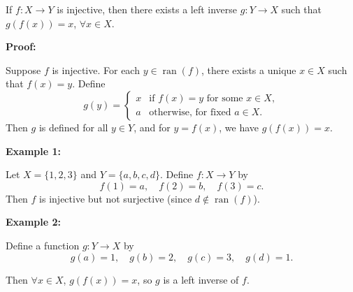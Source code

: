 \documentclass[12pt,a4paper,openany]{article}
\begin{document}
If $f : X \to Y$ is injective, then there exists a left inverse $g : Y \to X$ such that $g(f(x)) = x$, $\forall x \in X$.

\textbf{Proof:}

Suppose $f$ is injective. For each $y \in \operatorname{ran}(f)$, there exists a unique $x \in X$ such that $f(x) = y$. Define
\[
g(y) =
\begin{cases}
x & \text{if } f(x) = y \text{ for some } x \in X, \\
a & \text{otherwise, for fixed } a \in X.
\end{cases}
\]
Then $g$ is defined for all $y \in Y$, and for $y = f(x)$, we have $g(f(x)) = x$.

\textbf{Example 1:}

Let $X = \{1,2,3\}$ and $Y = \{a,b,c,d\}$. Define $f : X \to Y$ by
\[
f(1) = a, \quad f(2) = b, \quad f(3) = c.
\]
Then $f$ is injective but not surjective (since $d \notin \operatorname{ran}(f)$).

\textbf{Example 2:}

Define a function $g : Y \to X$ by
\[
g(a) = 1, \quad g(b) = 2, \quad g(c) = 3, \quad g(d) = 1.
\]

Then $\forall x \in X$, $g(f(x)) = x$, so $g$ is a left inverse of $f$.

\begin{center}
\end{center}
\end{document}
